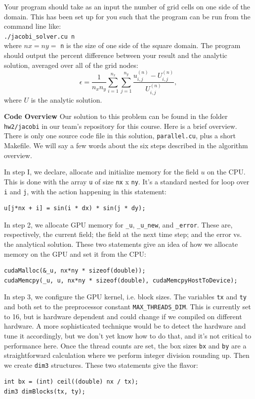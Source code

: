 \documentclass[11pt]{article}
\newcommand{\tty}[1]{\texttt{#1}}
\begin{document}
    Your program should take as an input the number of grid cells on one side of the domain.
    This has been set up for you such that the program can be run from the command line like: 
    \vspace{3mm}\\ \texttt{./jacobi\_solver.cu n} \vspace{3mm}\\
    where \(nx = ny = \) \texttt{n} is the size of one side of the square domain.
    The program should output the percent difference between your result and the analytic solution, averaged over all of the grid nodes:
    \begin{equation}
      \epsilon = \frac{1}{n_x n_y} \sum_{i=1}^{n_x} \sum_{j=1}^{n_y} \frac{u_{i,j}^{\left(n\right)} -
U_{i,j}^{\left(n\right)}}{U_{i,j}^{\left(n\right)}},
    \end{equation}
    where \(U\) is the analytic solution.
    
\textbf{Code Overview}
Our solution to this problem can be found in the folder \tty{hw2/jacobi} in our team's repository for this course.
Here is a brief overview.  There is only one source code file in this solution, \tty{parallel.cu},
plus a short Makefile.  We will say a few words about the six steps described in the algorithm overview.

In step I, we declare, allocate and initialize memory for the field $u$ on the CPU.  
This is done with the array \tty{u} of size \tty{nx} x \tty{ny}.  
It's a standard nested for loop over \tty{i} and \tty{j}, with the action happening in this statement:
\begin{lstlisting}[style=CodeSnippet]
u[j*nx + i] = sin(i * dx) * sin(j * dy); 
\end{lstlisting}
In step 2, we allocate GPU memory for \tty{\_u}, \tty{\_u\_new}, and \tty{\_error}.
These are, respectively, the current field; the field at the next time step; 
and the error vs. the analytical solution.  
These two statements give an idea of how we allocate memory on the GPU and set it from the CPU:
\begin{lstlisting}[style=CodeSnippet]
cudaMalloc(&_u, nx*ny * sizeof(double));
cudaMemcpy(_u, u, nx*ny * sizeof(double), cudaMemcpyHostToDevice);
\end{lstlisting}

In step 3, we configure the GPU kernel, i.e. block sizes.
The variables \tty{tx} and \tty{ty} and both set to the preprocessor constant \tty{MAX\_THREADS\_DIM}.
This is currently set to 16, but is hardware dependent and could change if we compiled on different hardware.
A more sophisticated technique would be to detect the hardware and tune it accordingly, 
but we don't yet know how to do that, and it's not critical to performance here.
Once the thread counts are set, the box sizes \tty{bx} and \tty{by} are a straightforward 
calculation where we perform integer division rounding up.  Then we create \tty{dim3} structures.
These two statements give the flavor:
\begin{lstlisting}[style=CodeSnippet]
int bx = (int) ceil((double) nx / tx);
dim3 dimBlocks(tx, ty);
\end{lstlisting}
\end{document}
